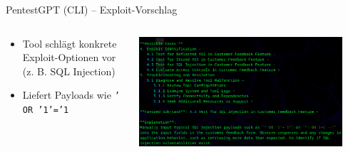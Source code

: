 \documentclass[
	aspectratio=169,	%
	onlytextwidth,		%
	t,					%
	]{beamer}
\begin{document}
\begin{frame}{PentestGPT (CLI) – Exploit-Vorschlag}
	\begin{columns}
		\begin{column}[T]{.4\textwidth}
			\begin{itemize}
				\item Tool schlägt konkrete Exploit-Optionen vor 
				(z. B. SQL Injection)
				\item Liefert Payloads wie \texttt{' OR '1'='1}
			\end{itemize}
		\end{column}
		\begin{column}[T]{.6\textwidth}
			\centering
			
			\includegraphics[width=0.9\textwidth]{figures/13.png}
			\label{fig:13}
		\end{column}
	\end{columns}
\end{frame}
\end{document}

